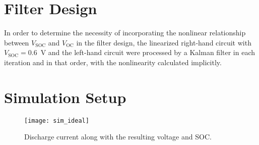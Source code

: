 \section{Filter Design}

In order to determine the necessity of incorporating the nonlinear relationship between $V_\text{SOC}$ and $V_\text{OC}$ in the filter design, the linearized right-hand circuit with $V_\text{SOC}=0.6$~V and the left-hand circuit were processed by a Kalman filter in each iteration and in that order, with the nonlinearity calculated implicitly.

\section{Simulation Setup}

\begin{figure}
\centering
\texttt{[image: sim\_ideal]}
\caption{Discharge current along with the resulting voltage and SOC.}
\label{fig:idealsim}
\end{figure}
